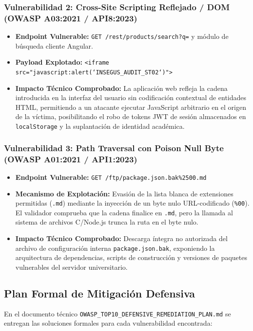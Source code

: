 \documentclass[11pt,a4paper]{article}
\begin{document}
\subsubsection{Vulnerabilidad 2: Cross-Site Scripting Reflejado / DOM (OWASP A03:2021 / API8:2023)}
\begin{itemize}[noitemsep]
    \item \textbf{Endpoint Vulnerable:} \texttt{GET /rest/products/search?q=} y módulo de búsqueda cliente Angular.
    \item \textbf{Payload Explotado:} \texttt{<iframe src="javascript:alert(`INSEGUS\_AUDIT\_ST02`)">}
    \item \textbf{Impacto Técnico Comprobado:} La aplicación web refleja la cadena introducida en la interfaz del usuario sin codificación contextual de entidades HTML, permitiendo a un atacante ejecutar JavaScript arbitrario en el origen de la víctima, posibilitando el robo de tokens JWT de sesión almacenados en \texttt{localStorage} y la suplantación de identidad académica.
\end{itemize}

\subsubsection{Vulnerabilidad 3: Path Traversal con Poison Null Byte (OWASP A01:2021 / API1:2023)}
\begin{itemize}[noitemsep]
    \item \textbf{Endpoint Vulnerable:} \texttt{GET /ftp/package.json.bak\%2500.md}
    \item \textbf{Mecanismo de Explotación:} Evasión de la lista blanca de extensiones permitidas (\texttt{.md}) mediante la inyección de un byte nulo URL-codificado (\texttt{\%00}). El validador comprueba que la cadena finalice en \texttt{.md}, pero la llamada al sistema de archivos C/Node.js trunca la ruta en el byte nulo.
    \item \textbf{Impacto Técnico Comprobado:} Descarga íntegra no autorizada del archivo de configuración interna \texttt{package.json.bak}, exponiendo la arquitectura de dependencias, scripts de construcción y versiones de paquetes vulnerables del servidor universitario.
\end{itemize}

\subsection{Plan Formal de Mitigación Defensiva}
En el documento técnico \texttt{OWASP\_TOP10\_DEFENSIVE\_REMEDIATION\_PLAN.md} se entregan las soluciones formales para cada vulnerabilidad encontrada:
\end{document}
